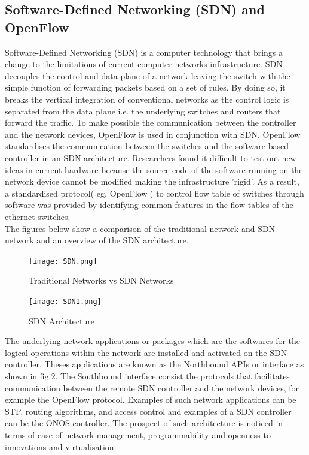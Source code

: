 \documentclass{article}
\begin{document}
\subsection{Software-Defined Networking (SDN) and OpenFlow} 
Software-Defined Networking (SDN) is a computer technology that brings a change to the limitations of current computer networks infrastructure. SDN\cite{6587999} decouples the control and data plane of a network leaving the switch with the simple function of forwarding packets based on a set of rules. By doing so, it breaks the vertical integration of conventional networks as the control logic is separated from the data plane i.e. the underlying switches and routers that forward the traffic\cite{6994333}. To make possible the communication between the controller and the network devices, OpenFlow\cite{6587999} is used in conjunction with SDN. OpenFlow standardises the communication between the switches and the software-based controller in an SDN architecture. Researchers found it difficult to test out new ideas in current hardware because the source code of the software running on the network device cannot be modified making the infrastructure 'rigid'. As a result, a standardised protocol( eg. OpenFlow ) to control flow table of switches through software was provided by identifying common features in the flow tables of the ethernet switches\cite{6587999}.\\The figures below show a comparison of the traditional network and SDN network and an overview of the SDN architecture.\\
    \begin{figure}[h]
        \centering
        \texttt{[image: SDN.png]}
        \caption{Traditional Networks vs SDN Networks}
        \label{SDN}
    \end{figure}
    
    \newpage
    \begin{figure}[h]
        \centering
        \texttt{[image: SDN1.png]}
        \caption{SDN Architecture}
        \label{SDN}
    \end{figure} 
The underlying network applications or packages which are the softwares for the logical operations within the network are installed and activated on the SDN controller. Theses applications are known as the Northbound APIs or interface as shown in fig.2. The Southbound interface consist the protocols that facilitates communication between the remote SDN controller and the network devices, for example the OpenFlow\cite{10220519} protocol. Examples of such network applications can be STP, routing algorithms, and access control and examples of a SDN controller can be the ONOS controller. The prospect of such architecture is noticed in terms of ease of network management, programmability and openness to innovations and virtualisation.
\end{document}
